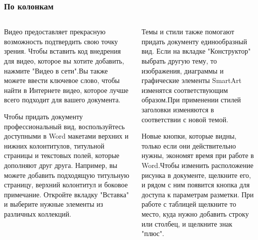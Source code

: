 \documentclass{beamer}
\begin{document}
\begin{frame}
	\frametitle{По колонкам}
	\begin{columns}[t]
		\begin{column}{0.5\textwidth}
			\scriptsize
			Видео предоставляет прекрасную возможность подтвердить свою точку зрения. Чтобы вставить код внедрения для видео, которое вы хотите добавить, нажмите "Видео в сети".Вы также можете ввести ключевое слово, чтобы найти в Интернете видео, которое лучше всего подходит для вашего документа.

			Чтобы придать документу профессиональный вид, воспользуйтесь доступными в Word макетами верхних и нижних колонтитулов, титульной страницы и текстовых полей, которые дополняют друг друга. Например, вы можете добавить подходящую титульную страницу, верхний колонтитул и боковое примечание. Откройте вкладку "Вставка" и выберите нужные элементы из различных коллекций.
		\end{column}
		\begin{column}{0.5\textwidth}	
			\tiny		
			Темы и стили также помогают придать документу единообразный вид. Если на вкладке "Конструктор" выбрать другую тему, то изображения, диаграммы и графические элементы SmartArt изменятся соответствующим образом.При применении стилей заголовки изменяются в соответствии с новой темой.

			\medskip
			Новые кнопки, которые видны, только если они действительно нужны, экономят время при работе в Word.Чтобы изменить расположение рисунка в документе, щелкните его, и рядом с ним появится кнопка для доступа к параметрам разметки. При работе с таблицей щелкните то место, куда нужно добавить строку или столбец, и щелкните знак "плюс".
		\end{column}
	\end{columns}
\end{frame}
		
\end{document}
